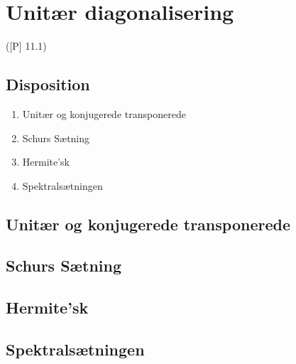 \newpage
\chapter{Unitær diagonalisering}
([P] 11.1)

\section*{Disposition}
\begin{enumerate}
	\item Unitær og konjugerede transponerede
	\item Schurs Sætning
	\item Hermite'sk
	\item Spektralsætningen
\end{enumerate}

\section{Unitær og konjugerede transponerede}



\section{Schurs Sætning}


\section{Hermite'sk}


\section{Spektralsætningen}

